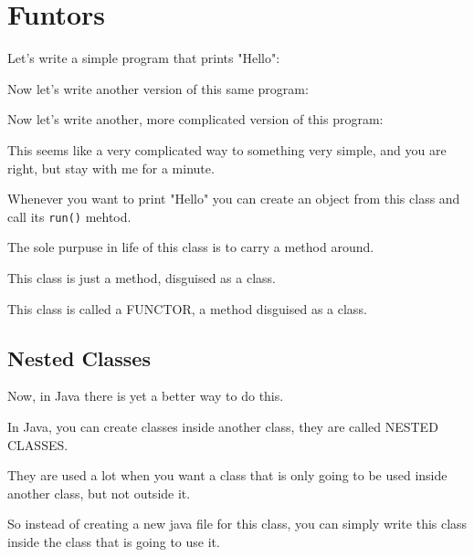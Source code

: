 \documentclass[a4paper, 9pt]{extarticle}
\begin{document}
\section{Funtors}


Let's write a simple program that prints "Hello":


Now let's write another version of this same program:


Now let's write another, more complicated version of this program:

\begin{multicols}{2}
  \columnbreak
\end{multicols}

This seems like a very complicated way to something very simple, and you are
right, but stay with me for a minute.

Whenever you want to print "Hello" you can create an object from this class
and call its \verb+run()+ mehtod.

The sole purpuse in life of this class is to carry a method around.

This class is just a method, disguised as a class.

This class is called a FUNCTOR, a method disguised as a class.








\subsection{Nested Classes}

Now, in Java there is yet a better way to do this.

In Java, you can create classes inside another class, they are called NESTED
CLASSES.

They are used a lot when you want a class that is only going to be used inside
another class, but not outside it.

So instead of creating a new java file for this class, you can simply write
this class inside the class that is going to use it.

\end{document}
